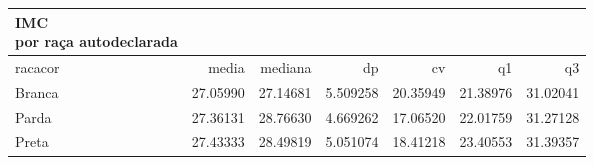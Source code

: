 \captionsetup[table]{labelformat=empty,skip=1pt}
\begin{longtable}{lrrrrrr}
\caption*{
{\large \textbf{IMC}} \\ 
{\small \textbf{por raça autodeclarada}}
} \\ 
\toprule
racacor & media & mediana & dp & cv & q1 & q3 \\ 
\midrule
Branca & 27.05990 & 27.14681 & 5.509258 & 20.35949 & 21.38976 & 31.02041 \\ 
Parda & 27.36131 & 28.76630 & 4.669262 & 17.06520 & 22.01759 & 31.27128 \\ 
Preta & 27.43333 & 28.49819 & 5.051074 & 18.41218 & 23.40553 & 31.39357 \\ 
\bottomrule
\end{longtable}

